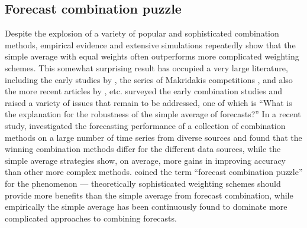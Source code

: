 \documentclass[a4paper,11pt]{article}
\begin{document}
\subsection{Forecast combination puzzle}
\label{sec:puzzle}

Despite the explosion of a variety of popular and sophisticated combination methods, empirical evidence and extensive simulations repeatedly show that the simple average with equal weights often outperforms more complicated weighting schemes. This somewhat surprising result has occupied a very large literature, including the early studies by \citet{Stock1998-np,Stock2003-sp,Stock2004-rq}, the series of Makridakis competitions \citep{Makridakis1982-hb,Makridakis2000-he,Makridakis2020-hu}, and also the more recent articles by \citet{Blanc2016-sn,Blanc2020-pg}, etc. \citet{Clemen1989-fb} surveyed the early combination studies and raised a variety of issues that remain to be addressed, one of which is ``What is the explanation for the robustness of the simple average of forecasts?'' In a recent study, \citet{Gastinger2021-ey} investigated the forecasting performance of a collection of combination methods on a large number of time series from diverse sources and found that the winning combination methods differ for the different data sources, while the simple average strategies show, on average, more gains in improving accuracy than other more complex methods. \citet{Stock2004-rq} coined the term ``forecast combination puzzle'' for the phenomenon --- theoretically sophisticated weighting schemes should provide more benefits than the simple average from forecast combination, while empirically the simple average has been continuously found to dominate more complicated approaches to combining forecasts.
\end{document}
